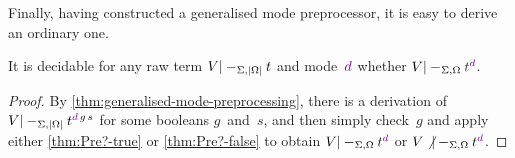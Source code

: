 Finally, having constructed a generalised mode preprocessor, it is easy to derive an ordinary one.

\begin{corollary}\label{thm:mode-preprocessing}
  It is decidable for any raw term $V |-_{\Sigma,\left|\Omega\right|} t$ and mode~$\dir{d}$ whether $V |-_{\Sigma,\Omega} \isTerm{t}^\dir{d}$.
\end{corollary}

\begin{proof}
By \cref{thm:generalised-mode-preprocessing}, there is a derivation of $V |-_{\Sigma,\erase\Omega} t^{\dir{d}\,g\,s}$ for some booleans $g$~and~$s$, and then simply check~$g$ and apply either \cref{thm:Pre?-true} or \cref{thm:Pre?-false} to obtain $V |-_{\Sigma,\Omega} t^\dir{d}$ or $V \not|-_{\Sigma,\Omega} t^\dir{d}$.
\end{proof}

%
%
%
%
%

